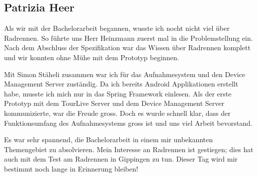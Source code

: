 \subsection{Patrizia Heer}
Als wir mit der Bachelorarbeit begannen, wusste ich nocht nicht viel über Radrennen. So führte uns Herr Heinzmann zuerst mal in die Problemstellung ein. Nach dem Abschluss der Spezifikation war das Wissen über Radrennen komplett und wir konnten ohne Mühe mit dem Prototyp beginnen.

Mit Simon Stäheli zusammen war ich für das Aufnahmesystem und den Device Management Server zuständig. Da ich bereits Android Applikationen erstellt habe, musste ich mich nur in das Spring Framework einlesen. Als der erste Prototyp mit dem TourLive Server und dem Device Management Server kommunizierte, war die Freude gross. Doch es wurde schnell klar, dass der Funktionsumfang des Aufnahmesystems gross ist und uns viel Arbeit bevorstand.

Es war sehr spannend, die Bachelorarbeit in einem mir unbekannten Themengebiet zu absolvieren. Mein Interesse an Radrennen ist gestiegen; dies hat auch mit dem Test am Radrennen in Gippingen zu tun. Dieser Tag wird mir bestimmt noch lange in Erinnerung bleiben!

